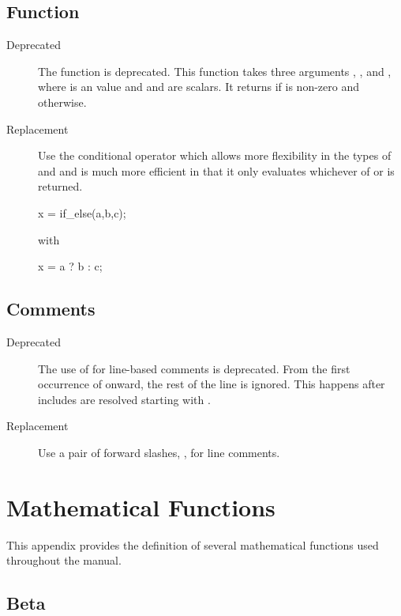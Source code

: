\section{ Function}

\begin{description}
\item[Deprecated]The function  is deprecated.  This
  function takes three arguments , , and ,
  where  is an  value and  and  are
  scalars. It returns  if  is non-zero and 
  otherwise.
%
\item[Replacement] Use the conditional operator which allows more
  flexibility in the types of  and  and is much more
  efficient in that it only evaluates whichever of  or
   is returned. 
\begin{stancode}
x = if_else(a,b,c);
\end{stancode}
 with
\begin{stancode}
x = a ? b : c;
\end{stancode}
\end{description}

\section{\code{\#} Comments}

\begin{description}
\item[Deprecated] The use of \code{\#} for line-based comments is
  deprecated.  From the first occurrence of \code{\#} onward, the rest
  of the line is ignored.  This happens after includes are resolved
  starting with .
\item[Replacement] Use a pair of forward slashes, \code{//}, for line
  comments.
\end{description}


\chapter{Mathematical Functions}\label{math-functions.appendix}

This appendix provides the definition of several mathematical
functions used throughout the manual.

\section{Beta}\label{beta-appendix.section}


